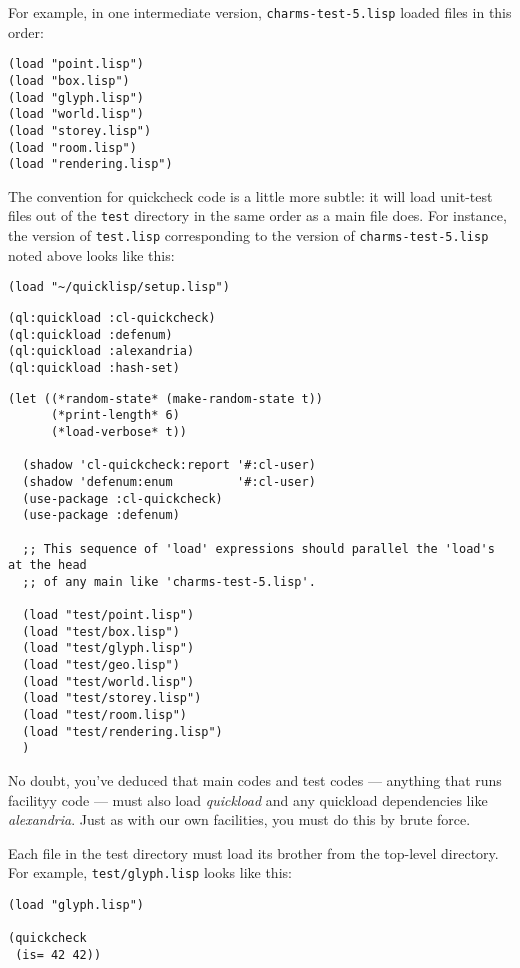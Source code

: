 \documentclass[10pt,oneside,x11names]{article}
\begin{document}
For example, in one intermediate version, \texttt{charms-test-5.lisp} loaded files in
this order:
\begin{verbatim}
(load "point.lisp")
(load "box.lisp")
(load "glyph.lisp")
(load "world.lisp")
(load "storey.lisp")
(load "room.lisp")
(load "rendering.lisp")
\end{verbatim}

The convention for quickcheck code is a little more subtle: it will load
unit-test files out of the \texttt{test} directory in the same order as a main file
does. For instance, the version of \texttt{test.lisp} corresponding to the version of
\texttt{charms-test-5.lisp} noted above looks like this:

\begin{verbatim}
(load "~/quicklisp/setup.lisp")
\end{verbatim}

\begin{verbatim}
(ql:quickload :cl-quickcheck)
(ql:quickload :defenum)
(ql:quickload :alexandria)
(ql:quickload :hash-set)
\end{verbatim}

\begin{verbatim}
(let ((*random-state* (make-random-state t))
      (*print-length* 6)
      (*load-verbose* t))

  (shadow 'cl-quickcheck:report '#:cl-user)
  (shadow 'defenum:enum         '#:cl-user)
  (use-package :cl-quickcheck)
  (use-package :defenum)

  ;; This sequence of 'load' expressions should parallel the 'load's at the head
  ;; of any main like 'charms-test-5.lisp'.

  (load "test/point.lisp")
  (load "test/box.lisp")
  (load "test/glyph.lisp")
  (load "test/geo.lisp")
  (load "test/world.lisp")
  (load "test/storey.lisp")
  (load "test/room.lisp")
  (load "test/rendering.lisp")
  )
\end{verbatim}

No doubt, you've deduced that main codes and test codes --- anything that runs
facilityy code --- must also load \emph{quickload} and any quickload dependencies
like \emph{alexandria}.  Just as with our own facilities, you must do this by brute
force. 

Each file in the test directory must load its brother from the top-level
directory. For example, \texttt{test/glyph.lisp} looks like this:

\begin{verbatim}
(load "glyph.lisp")

(quickcheck
 (is= 42 42))
\end{verbatim}
\end{document}
